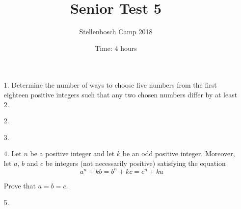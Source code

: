 \documentclass[a4paper, 12pt]{article}
\title{Senior Test 5}
\author{Stellenbosch Camp 2018}
\date{Time: $4$ hours}
\begin{document}
 \maketitle

\begin{enumerate}

\item[1.] Determine the number of ways to choose five numbers from the first eighteen positive integers such that any two chosen numbers differ by at least $2$.


\vspace{6pt}

% 
\item[2.] 


\vspace{6pt}

% 
\item[3.] 


\vspace{6pt}

\item[4.] Let $n$ be a positive integer and let $k$ be an odd positive integer. Moreover, let $a$, $b$ and $c$ be integers (not necessarily positive) satisfying the equation
\begin{equation*}
    a^n + kb = b^n + kc = c^n + ka
\end{equation*}

Prove that $a=b=c$.


\vspace{6pt}

% 
\item[5.] 


\end{enumerate}

\vfill

\centering
\begin{BVerbatim}
\end{BVerbatim}
\end{document}
